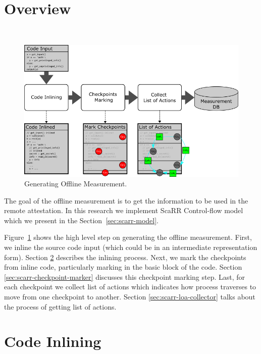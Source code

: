 \section{Overview}\
\label{sec:overview}

\begin{figure}[t]
    \centerline{\includegraphics[scale=.70]{Figures/04/scarr-overview.png}}
    \caption{Generating Offline Measurement.}
    \label{fig:scarr-overview}
\end{figure}

The goal of the offline measurement is to get the information to be used in the
remote attestation. In this research we implement ScaRR Control-flow
model~\cite{toffaliniScaRRScalableRuntime2019} which we present in the
Section~\ref{sec:scarr-model}. 

Figure~\ref{fig:scarr-overview} shows the high level step on generating the
offline measurement. First, we inline the source code input (which could be in
an intermediate representation form). Section \ref{sec:code-inlining} describes
the inlining process. Next, we mark the checkpoints from inline code,
particularly marking in the basic block of the code. Section
\ref{sec:scarr-checkpoint-marker} discusses this checkpoint marking step. Last,
for each checkpoint we collect list of actions which indicates how process
traverses to move from one checkpoint to another. Section
\ref{sec:scarr-loa-collector} talks about the process of getting list of
actions.



\section{Code Inlining}
\label{sec:code-inlining}

